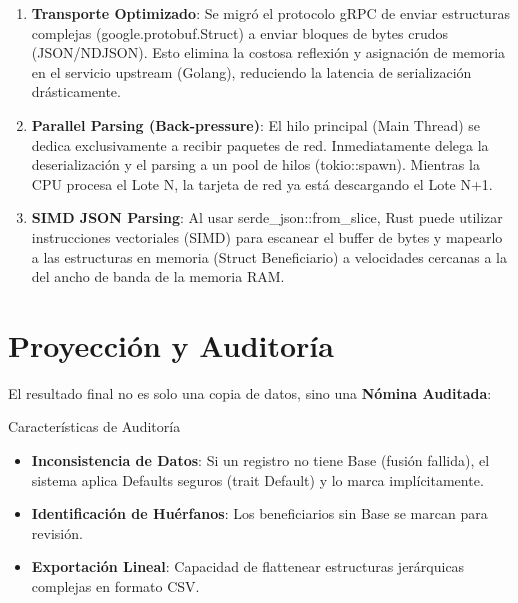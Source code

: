 
\begin{enumerate}
\item \textbf{Transporte Optimizado}: Se migró el protocolo gRPC de enviar estructuras complejas (google.protobuf.Struct) a enviar bloques de bytes crudos (JSON/NDJSON). Esto elimina la costosa reflexión y asignación de memoria en el servicio upstream (Golang), reduciendo la latencia de serialización drásticamente.

\item \textbf{Parallel Parsing (Back-pressure)}: El hilo principal (Main Thread) se dedica exclusivamente a recibir paquetes de red. Inmediatamente delega la deserialización y el parsing a un pool de hilos (tokio::spawn). Mientras la CPU procesa el Lote N, la tarjeta de red ya está descargando el Lote N+1.

\item \textbf{SIMD JSON Parsing}: Al usar serde\_json::from\_slice, Rust puede utilizar instrucciones vectoriales (SIMD) para escanear el buffer de bytes y mapearlo a las estructuras en memoria (Struct Beneficiario) a velocidades cercanas a la del ancho de banda de la memoria RAM.
\end{enumerate}


\section{Proyección y Auditoría}

El resultado final no es solo una copia de datos, sino una \textbf{Nómina Auditada}:


\begin{caja}{Características de Auditoría}
\begin{itemize}
\item \textbf{Inconsistencia de Datos}: Si un registro no tiene Base (fusión fallida), el sistema aplica Defaults seguros (trait Default) y lo marca implícitamente.
\item \textbf{Identificación de Huérfanos}: Los beneficiarios sin Base se marcan para revisión.
\item \textbf{Exportación Lineal}: Capacidad de flattenear estructuras jerárquicas complejas en formato CSV.
\end{itemize}
\end{caja}

